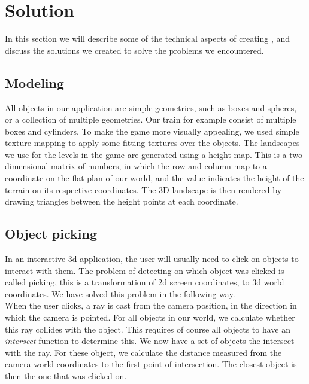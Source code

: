 \section{Solution}
In this section we will describe some of the technical aspects of creating \name, and discuss the solutions we created to solve the problems we encountered.
\subsection{Modeling}
All objects in our application are simple geometries, such as boxes and spheres, or a collection of multiple geometries. Our train for example consist of multiple boxes and cylinders. To make the game more visually appealing, we used simple texture mapping to apply some fitting textures over the objects. The landscapes we use for the levels in the game are generated using a height map. This is a two dimensional matrix of numbers, in which the row and column map to a coordinate on the flat plan of our world, and the value indicates the height of the terrain on its respective coordinates. The 3D landscape is then rendered by drawing triangles between the height points at each coordinate.
\subsection{Object picking}
In an interactive 3d application, the user will usually need to click on objects to interact with them. The problem of detecting on which object was clicked is called picking, this is a transformation of 2d screen coordinates, to 3d world coordinates. We have solved this problem in the following way.\\
When the user clicks, a ray is cast from the camera position, in the direction in which the camera is pointed. For all objects in our world, we calculate whether this ray collides with the object. This requires of course all objects to have an \emph{intersect} function to determine this. We now have a set of objects the intersect with the ray. For these object, we calculate the distance measured from the camera world coordinates to the first point of intersection. The closest object is then the one that was clicked on.
